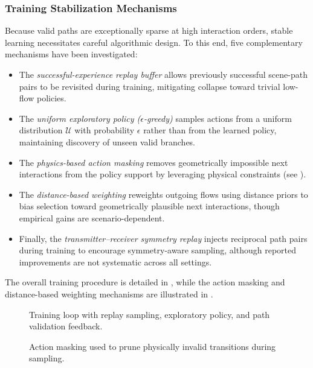 \subsubsection{Training Stabilization Mechanisms}

Because valid paths are exceptionally sparse at high interaction orders, stable learning necessitates careful algorithmic design. To this end, five complementary mechanisms have been investigated:

\begin{itemize}
  \item The \emph{successful-experience replay buffer} allows previously successful scene-path pairs to be revisited during training, mitigating collapse toward trivial low-flow policies.
  \item The \emph{uniform exploratory policy ($\epsilon$-greedy)} samples actions from a uniform distribution $\mathcal{U}$ with probability $\epsilon$ rather than from the learned policy, maintaining discovery of unseen valid branches.
  \item The \emph{physics-based action masking} removes geometrically impossible next interactions from the policy support by leveraging physical constraints (see ).
  \item The \emph{distance-based weighting} reweights outgoing flows using distance priors to bias selection toward geometrically plausible next interactions, though empirical gains are scenario-dependent.
  \item Finally, the \emph{transmitter--receiver symmetry replay} injects reciprocal path pairs during training to encourage symmetry-aware sampling, although reported improvements are not systematic across all settings.
\end{itemize}

The overall training procedure is detailed in , while the action masking and distance-based weighting mechanisms are illustrated in .

\begin{figure}
  \centering
  \caption{Training loop with replay sampling, exploratory policy, and path validation feedback.}
\end{figure}

\begin{figure}
  \centering
  \caption{Action masking used to prune physically invalid transitions during sampling.}
\end{figure}

